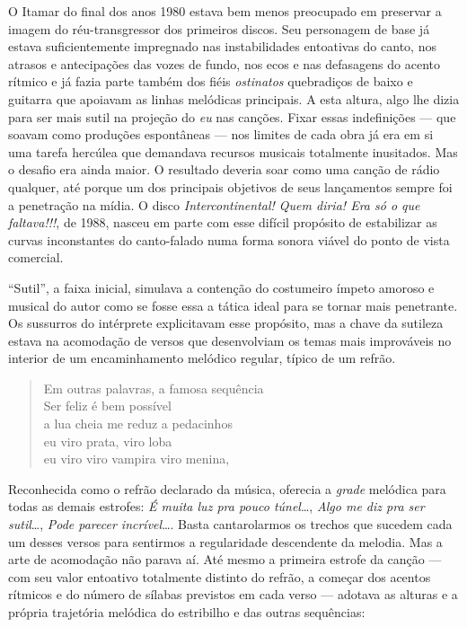 O Itamar do final dos anos 1980 estava bem menos preocupado em preservar
a imagem do réu-transgressor dos primeiros discos. Seu personagem de
base já estava suficientemente impregnado nas instabilidades entoativas
do canto, nos atrasos e antecipações das vozes de fundo, nos ecos e nas
defasagens do acento rítmico e já fazia parte também dos fiéis \textit{ostinatos}
quebradiços de baixo e guitarra que apoiavam as linhas melódicas
principais. A esta altura, algo lhe dizia para ser mais sutil na
projeção do \textit{eu} nas canções. Fixar essas indefinições --- que soavam
como produções espontâneas --- nos limites de cada obra já era em si uma
tarefa hercúlea que demandava recursos musicais totalmente inusitados.
Mas o desafio era ainda maior. O resultado deveria soar como uma canção
de rádio qualquer, até porque um dos principais objetivos de seus
lançamentos sempre foi a penetração na mídia. O disco \textit{Intercontinental!
Quem diria! Era só o que faltava!!!}, de 1988, nasceu em parte com esse
difícil propósito de estabilizar as curvas inconstantes do canto-falado
numa forma sonora viável do ponto de vista comercial.

``Sutil'', a faixa inicial, simulava a contenção do costumeiro ímpeto
amoroso e musical do autor como se fosse essa a tática ideal para se
tornar mais penetrante. Os sussurros do intérprete explicitavam esse
propósito, mas a chave da sutileza estava na acomodação de versos que
desenvolviam os temas mais improváveis no interior de um encaminhamento
melódico regular, típico de um refrão.

\begin{verse}
Em outras palavras, a famosa sequência\\
Ser feliz é bem possível\\
a lua cheia me reduz a pedacinhos\\
eu viro prata, viro loba\\
eu viro viro vampira viro menina,
\end{verse}

Reconhecida como o refrão declarado da música, oferecia a \textit{grade}
melódica para todas as demais estrofes: \textit{É muita luz pra pouco
túnel}\ldots, \textit{Algo me diz pra ser sutil}\ldots, \textit{Pode parecer
incrível}\ldots. Basta cantarolarmos os trechos que sucedem cada um desses
versos para sentirmos a regularidade descendente da melodia. Mas a arte
de acomodação não parava aí. Até mesmo a primeira estrofe da canção ---
com seu valor entoativo totalmente distinto do refrão, a começar dos
acentos rítmicos e do número de sílabas previstos em cada verso ---
adotava as alturas e a própria trajetória melódica do estribilho e das
outras sequências:

